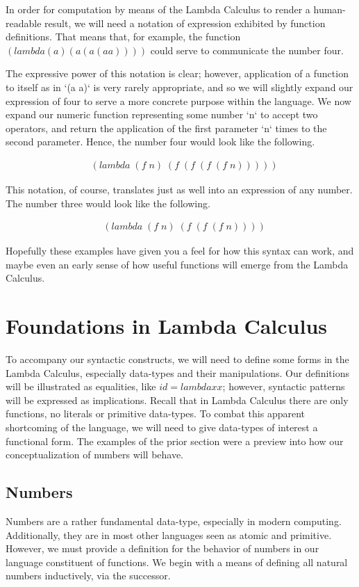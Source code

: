 In order for computation by means of the Lambda Calculus to render a 
human-readable result, we will need a notation of expression exhibited by function
definitions. That means that, for example, the function 
$(lambda (a) (a (a (a a))))$ could serve to communicate the number four.

The expressive power of this notation is clear; however, application of a function 
to itself as in `(a a)` is very rarely appropriate, and so we will slightly expand 
our expression of four to serve a more concrete purpose within the language. We
now expand our numeric function representing some number `n` to accept two
operators, and return the application of the first parameter `n` times to the
second parameter. Hence, the number four would look like the following.

\begin{align*}
& (lambda \; (f \; n) \; (f \; (f \; (f \; (f \; n)))))
\end{align*}

This notation, of course, translates just as well into an expression of any
number. The number three would look like the following.

\begin{align*}
& (lambda \; (f \; n) \; (f \; (f \; (f \; n))))
\end{align*}

Hopefully these examples have given you a feel for how this syntax can work, and
maybe even an early sense of how useful functions will emerge from the Lambda
Calculus.

\section{Foundations in Lambda Calculus}
To accompany our syntactic constructs, we will need to define some forms in the
Lambda Calculus, especially data-types and their manipulations. Our definitions
will be illustrated as equalities, like $id = lambda xx$; however, syntactic
patterns will be expressed as implications. Recall that in Lambda Calculus there
are only functions, no literals or primitive data-types. To combat this apparent
shortcoming of the language, we will need to give data-types of interest a
functional form. The examples of the prior section were a preview into how our
conceptualization of numbers will behave.

\subsection{Numbers}
Numbers are a rather fundamental data-type, especially in modern computing.
Additionally, they are in most other languages seen as atomic and primitive.
However, we must provide a definition for the behavior of numbers in our language 
constituent of functions. We begin with a means of defining all natural numbers
inductively, via the successor.

